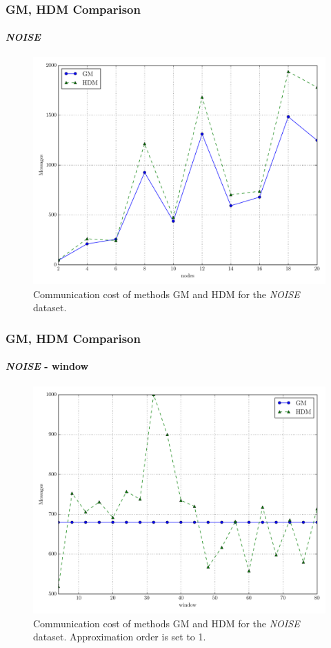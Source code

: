 \documentclass[hyperref={pdfpagelabels=false}]{beamer}
\begin{document}
\begin{frame} \frametitle{GM, HDM Comparison}\framesubtitle{\emph{NOISE}}
\begin{figure}
\vspace{-0.5cm}
\centering
\includegraphics[scale=0.3]{../img/main_msg_noisyinterweaving_nodes.pdf}
  \caption{Communication cost of methods GM and HDM for the \emph{NOISE} dataset.}
\end{figure}
\end{frame}


\begin{frame} \frametitle{GM, HDM Comparison}\framesubtitle{\emph{NOISE} - window}
\begin{figure}
\vspace{-0.5cm}
\centering
\includegraphics[scale=0.3]{../img/main_msg_noisyinterweaving_window.pdf}
  \caption{Communication cost of methods GM and HDM for the \emph{NOISE} dataset. Approximation order is set to 1.}
\end{figure}
\end{frame}
\end{document}
